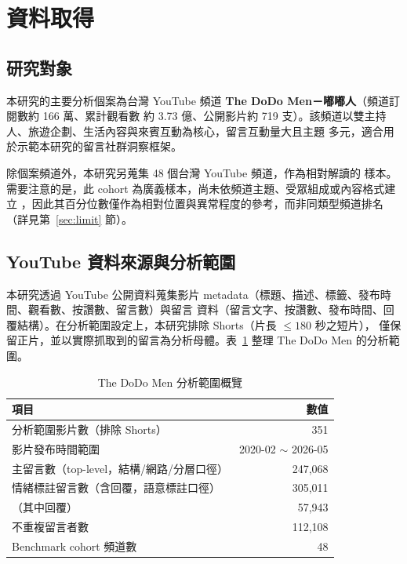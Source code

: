 \section{資料取得}

\subsection{研究對象}

本研究的主要分析個案為台灣 YouTube 頻道 \textbf{The DoDo Men－嘟嘟人}（頻道訂閱數約 166 萬、累計觀看數
約 3.73 億、公開影片約 719 支）。該頻道以雙主持人、旅遊企劃、生活內容與來賓互動為核心，留言互動量大且主題
多元，適合用於示範本研究的留言社群洞察框架。

除個案頻道外，本研究另蒐集 48 個台灣  YouTube 頻道，作為相對解讀的  樣本。需要注意的是，此 cohort 為廣義樣本，尚未依頻道主題、受眾組成或內容格式建立 ，因此其百分位數僅作為相對位置與異常程度的參考，而非同類型頻道排名（詳見第~\ref{sec:limit} 節）。

\subsection{YouTube 資料來源與分析範圍}

本研究透過 YouTube 公開資料蒐集影片 metadata（標題、描述、標籤、發布時間、觀看數、按讚數、留言數）與留言
資料（留言文字、按讚數、發布時間、回覆結構）。在分析範圍設定上，本研究排除 Shorts（片長 $\le 180$ 秒之短片），
僅保留正片，並以實際抓取到的留言為分析母體。表~\ref{tab:scope} 整理 The DoDo Men 的分析範圍。

\begin{table}[H]
\centering
\caption{The DoDo Men 分析範圍概覽}
\label{tab:scope}
\small
\begin{tabular}{lr}
\toprule
\textbf{項目} & \textbf{數值}\\
\midrule
分析範圍影片數（排除 Shorts） & 351 \\
影片發布時間範圍 & 2020-02 $\sim$ 2026-05 \\
主留言數（top-level，結構/網路/分層口徑） & 247{,}068 \\
情緒標註留言數（含回覆，語意標註口徑） & 305{,}011 \\
\quad（其中回覆） & 57{,}943 \\
不重複留言者數 & 112{,}108 \\
Benchmark cohort 頻道數 & 48 \\
\bottomrule
\end{tabular}
\end{table}

